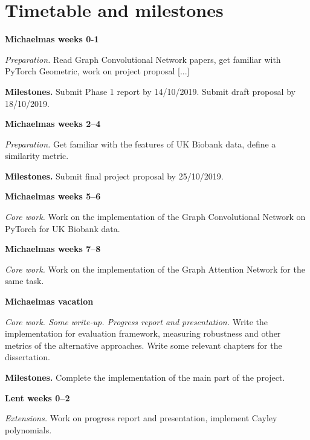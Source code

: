 \documentclass[12pt,a4paper,twoside]{article}
\begin{document}
\section*{Timetable and milestones}
\label{section:timetable}



\textbf{Michaelmas weeks 0-1}

\textit{Preparation.} Read Graph Convolutional Network papers, get familiar with PyTorch Geometric, work on project proposal [...]

\textbf{Milestones.} Submit Phase 1 report by 14/10/2019. Submit draft proposal by 18/10/2019.

\textbf{Michaelmas weeks 2–4}

\textit{Preparation.} Get familiar with the features of UK Biobank data, define a similarity metric.

\textbf{Milestones.} Submit final project proposal by 25/10/2019.

\textbf{Michaelmas weeks 5–6}

\textit{Core work.} Work on the implementation of the Graph Convolutional Network on PyTorch for UK Biobank data.

\textbf{Michaelmas weeks 7–8} 

\textit{Core work.} Work on the implementation of the Graph Attention Network for the same task.

\textbf{Michaelmas vacation}

\textit{Core work. Some write-up. Progress report and presentation.}  Write the implementation for evaluation framework, measuring robustness and other metrics of the alternative approaches. Write some relevant chapters for the dissertation.

\textbf{Milestones.} Complete the implementation of the main part of the project.

\textbf{Lent weeks 0–2}

\textit{Extensions.} Work on progress report and presentation, implement Cayley polynomials.
 
\end{document}
